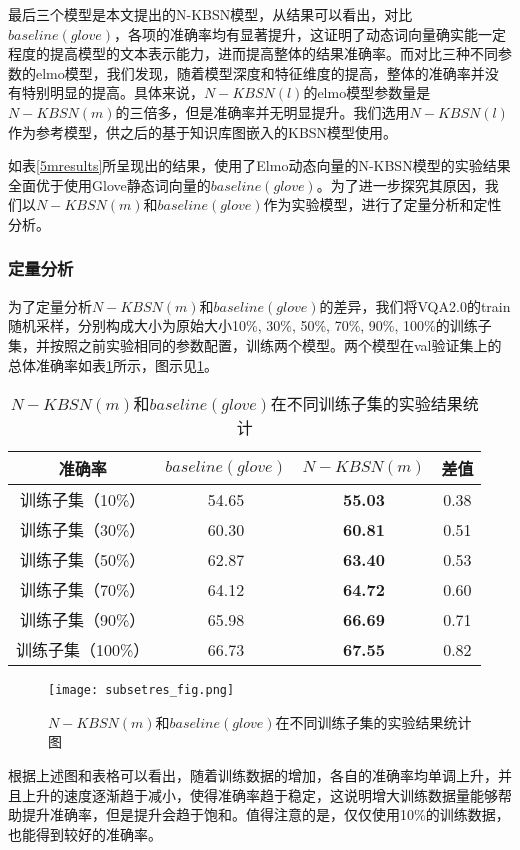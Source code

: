 最后三个模型是本文提出的N-KBSN模型，从结果可以看出，对比$baseline(glove)$，各项的准确率均有显著提升，这证明了动态词向量确实能一定程度的提高模型的文本表示能力，进而提高整体的结果准确率。而对比三种不同参数的elmo模型，我们发现，随着模型深度和特征维度的提高，整体的准确率并没有特别明显的提高。具体来说，$N-KBSN(l)$的elmo模型参数量是$N-KBSN(m)$的三倍多，但是准确率并无明显提升。我们选用$N-KBSN(l)$作为参考模型，供之后的基于知识库图嵌入的KBSN模型使用。

如表\ref{5mresults}所呈现出的结果，使用了Elmo动态向量的N-KBSN模型的实验结果全面优于使用Glove静态词向量的$baseline(glove)$。为了进一步探究其原因，我们以$N-KBSN(m)$和$baseline(glove)$作为实验模型，进行了定量分析和定性分析。

\subsubsection{定量分析}
为了定量分析$N-KBSN(m)$和$baseline(glove)$的差异，我们将VQA2.0的train随机采样，分别构成大小为原始大小10\%, 30\%, 50\%, 70\%, 90\%, 100\%的训练子集，并按照之前实验相同的参数配置，训练两个模型。两个模型在val验证集上的总体准确率如表\ref{subsetres}所示，图示见\ref{subsetres_fig}。
\begin{table}[H]
\centering
\caption{$N-KBSN(m)$和$baseline(glove)$在不同训练子集的实验结果统计}
\begin{tabular}{cccc}
\toprule
准确率 & $baseline(glove)$ & $N-KBSN(m)$ & 差值\\
\midrule
训练子集（10\%）&  54.65 & \textbf{55.03} & 0.38\\
训练子集（30\%）&  60.30& \textbf{60.81} & 0.51\\
训练子集（50\%）&  62.87& \textbf{63.40} & 0.53\\
训练子集（70\%）&  64.12& \textbf{64.72} & 0.60\\
训练子集（90\%）&  65.98& \textbf{66.69} & 0.71\\
训练子集（100\%）& 66.73 & \textbf{67.55} & 0.82\\
\bottomrule
\end{tabular}
\label{subsetres}
\end{table}
\begin{figure}[H]
	\texttt{[image: subsetres\_fig.png]}
	\caption{$N-KBSN(m)$和$baseline(glove)$在不同训练子集的实验结果统计图}
	\label{subsetres_fig}
\end{figure}

根据上述图和表格可以看出，随着训练数据的增加，各自的准确率均单调上升，并且上升的速度逐渐趋于减小，使得准确率趋于稳定，这说明增大训练数据量能够帮助提升准确率，但是提升会趋于饱和。值得注意的是，仅仅使用10\%的训练数据，也能得到较好的准确率。

